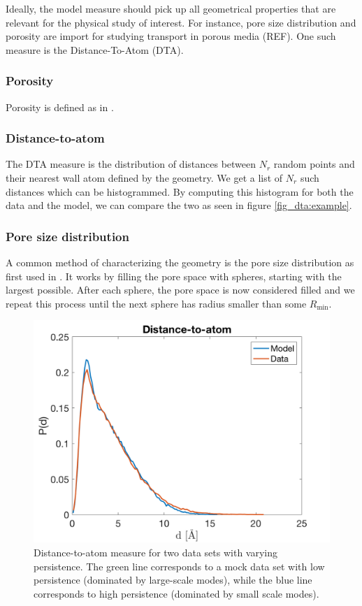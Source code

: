 \documentclass[aps,pre,twocolumn,letterpaper,floatfix,showpacs]{revtex4}
\begin{document}
Ideally, the model measure should pick up all geometrical properties that are relevant for the physical study of interest. For instance, pore size distribution and porosity are import for studying transport in porous media (REF). One such measure is the Distance-To-Atom (DTA).

\subsubsection{Porosity}
Porosity is defined as in \cite{gelb1998characterization}.

\subsubsection{Distance-to-atom}
The DTA measure is the distribution of distances between $N_r$ random points and their nearest wall atom defined by the geometry. We get a list of $N_r$ such distances which can be histogrammed. By computing this histogram for both the data and the model, we can compare the two as seen in figure \ref{fig_dta:example}. 

\subsubsection{Pore size distribution}
A common method of characterizing the geometry is the pore size distribution as first used in \cite{gelb1999pore}. It works by filling the pore space with spheres, starting with the largest possible. After each sphere, the pore space is now considered filled and we repeat this process until the next sphere has radius smaller than some $R_\text{min}$. 

\begin{figure}[htb!]
\includegraphics[width=.45\textwidth]{DTA.png}
\caption{Distance-to-atom measure for two data sets with varying persistence. The green line corresponds to a mock data set with low persistence (dominated by large-scale modes), while the blue line corresponds to high persistence (dominated by small scale modes). }
\label{fig:dta_example}
\end{figure}
\end{document}
